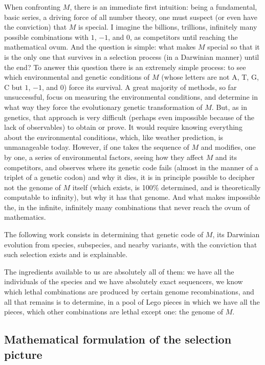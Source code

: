 \documentclass[11pt]{article}
\theoremstyle{definition}
\theoremstyle{remark}
\begin{document}
When confronting $M$, there is an immediate first intuition: being a fundamental, basic series, a driving force of all number theory, one must suspect (or even have the conviction) that $M$ is special.  I imagine the billions, trillions, infinitely many possible combinations with $1$, $-1$, and $0$, as competitors until reaching the mathematical ovum.  And the question is simple: what makes $M$ special so that it is the only one that survives in a selection process (in a Darwinian manner) until the end?  To answer this question there is an extremely simple process: to see which environmental and genetic conditions of $M$ (whose letters are not A, T, G, C but $1$, $-1$, and $0$) force its survival.  A great majority of methods, so far unsuccessful, focus on measuring the environmental conditions, and determine in what way they force the evolutionary genetic transformation of $M$.  But, as in genetics, that approach is very difficult (perhaps even impossible because of the lack of observables) to obtain or prove.  It would require knowing everything about the environmental conditions, which, like weather prediction, is unmanageable today.  However, if one takes the sequence of $M$ and modifies, one by one, a series of environmental factors, seeing how they affect $M$ and its competitors, and observes where its genetic code fails (almost in the manner of a triplet of a genetic codon) and why it dies, it is in principle possible to decipher not the genome of $M$ itself (which exists, is 100\% determined, and is theoretically computable to infinity), but why it has that genome.  And what makes impossible the, in the infinite, infinitely many combinations that never reach the ovum of mathematics.

The following work consists in determining that genetic code of $M$, its Darwinian evolution from species, subspecies, and nearby variants, with the conviction that such selection exists and is explainable.

The ingredients available to us are absolutely all of them: we have all the individuals of the species and we have absolutely exact sequencers, we know which lethal combinations are produced by certain genome recombinations, and all that remains is to determine, in a pool of Lego pieces in which we have all the pieces, which other combinations are lethal except one: the genome of $M$.

\subsection*{Mathematical formulation of the selection picture}
\end{document}
